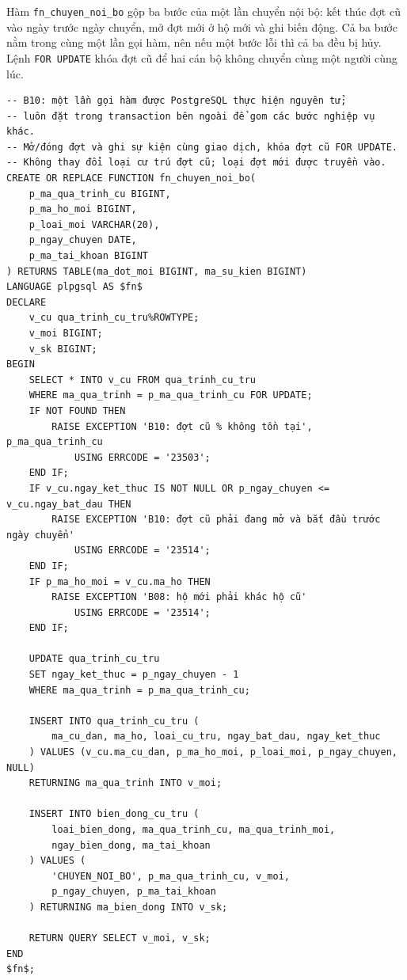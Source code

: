 Hàm \texttt{fn\_chuyen\_noi\_bo} gộp ba bước của một lần chuyển nội bộ: kết thúc đợt cũ vào ngày trước ngày chuyển, mở đợt mới ở hộ mới và ghi biến động. Cả ba bước nằm trong cùng một lần gọi hàm, nên nếu một bước lỗi thì cả ba đều bị hủy. Lệnh \texttt{FOR UPDATE} khóa đợt cũ để hai cán bộ không chuyển cùng một người cùng lúc.

\begin{lstlisting}[style=sqlvn, basicstyle=\ttfamily\fontsize{10pt}{10.5pt}\selectfont, caption={Hàm chuyển nội bộ trong một giao dịch (B10)}, label={lst:pl_chuyen}]
-- B10: một lần gọi hàm được PostgreSQL thực hiện nguyên tử;
-- luôn đặt trong transaction bên ngoài để gom các bước nghiệp vụ khác.
-- Mở/đóng đợt và ghi sự kiện cùng giao dịch, khóa đợt cũ FOR UPDATE.
-- Không thay đổi loại cư trú đợt cũ; loại đợt mới được truyền vào.
CREATE OR REPLACE FUNCTION fn_chuyen_noi_bo(
    p_ma_qua_trinh_cu BIGINT,
    p_ma_ho_moi BIGINT,
    p_loai_moi VARCHAR(20),
    p_ngay_chuyen DATE,
    p_ma_tai_khoan BIGINT
) RETURNS TABLE(ma_dot_moi BIGINT, ma_su_kien BIGINT)
LANGUAGE plpgsql AS $fn$
DECLARE
    v_cu qua_trinh_cu_tru%ROWTYPE;
    v_moi BIGINT;
    v_sk BIGINT;
BEGIN
    SELECT * INTO v_cu FROM qua_trinh_cu_tru
    WHERE ma_qua_trinh = p_ma_qua_trinh_cu FOR UPDATE;
    IF NOT FOUND THEN
        RAISE EXCEPTION 'B10: đợt cũ % không tồn tại', p_ma_qua_trinh_cu
            USING ERRCODE = '23503';
    END IF;
    IF v_cu.ngay_ket_thuc IS NOT NULL OR p_ngay_chuyen <= v_cu.ngay_bat_dau THEN
        RAISE EXCEPTION 'B10: đợt cũ phải đang mở và bắt đầu trước ngày chuyển'
            USING ERRCODE = '23514';
    END IF;
    IF p_ma_ho_moi = v_cu.ma_ho THEN
        RAISE EXCEPTION 'B08: hộ mới phải khác hộ cũ'
            USING ERRCODE = '23514';
    END IF;

    UPDATE qua_trinh_cu_tru
    SET ngay_ket_thuc = p_ngay_chuyen - 1
    WHERE ma_qua_trinh = p_ma_qua_trinh_cu;

    INSERT INTO qua_trinh_cu_tru (
        ma_cu_dan, ma_ho, loai_cu_tru, ngay_bat_dau, ngay_ket_thuc
    ) VALUES (v_cu.ma_cu_dan, p_ma_ho_moi, p_loai_moi, p_ngay_chuyen, NULL)
    RETURNING ma_qua_trinh INTO v_moi;

    INSERT INTO bien_dong_cu_tru (
        loai_bien_dong, ma_qua_trinh_cu, ma_qua_trinh_moi,
        ngay_bien_dong, ma_tai_khoan
    ) VALUES (
        'CHUYEN_NOI_BO', p_ma_qua_trinh_cu, v_moi,
        p_ngay_chuyen, p_ma_tai_khoan
    ) RETURNING ma_bien_dong INTO v_sk;

    RETURN QUERY SELECT v_moi, v_sk;
END
$fn$;
\end{lstlisting}

